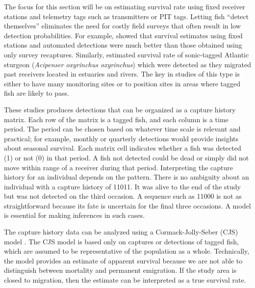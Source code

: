\documentclass[
]{krantz}
\begin{document}
The focus for this section will be on estimating survival rate using fixed receiver stations and telemetry tags such as transmitters or PIT tags. Letting fish ``detect themselves'' eliminates the need for costly field surveys that often result in low detection probabilities. For example, \citet{hewitt.etal_2010} showed that survival estimates using fixed stations and automated detections were much better than those obtained using only survey recaptures. Similarly, \citet{hightower.etal_2015} estimated survival rate of sonic-tagged Atlantic sturgeon (\emph{Acipenser oxyrinchus oxyrinchus}) which were detected as they migrated past receivers located in estuaries and rivers. The key in studies of this type is either to have many monitoring sites or to position sites in areas where tagged fish are likely to pass.

These studies produces detections that can be organized as a capture history matrix. Each row of the matrix is a tagged fish, and each column is a time period. The period can be chosen based on whatever time scale is relevant and practical; for example, monthly or quarterly detections would provide insights about seasonal survival. Each matrix cell indicates whether a fish was detected (1) or not (0) in that period. A fish not detected could be dead or simply did not move within range of a receiver during that period. Interpreting the capture history for an individual depends on the pattern. There is no ambiguity about an individual with a capture history of 11011. It was alive to the end of the study but was not detected on the third occasion. A sequence such as 11000 is not as straightforward because its fate is uncertain for the final three occasions. A model is essential for making inferences in such cases.

The capture history data can be analyzed using a Cormack-Jolly-Seber (CJS) model \citep{royle_2008, kéry.schaub_2012}. The CJS model is based only on captures or detections of tagged fish, which are assumed to be representative of the population as a whole. Technically, the model provides an estimate of apparent survival because we are not able to distinguish between mortality and permanent emigration. If the study area is closed to migration, then the estimate can be interpreted as a true survival rate.
\end{document}

